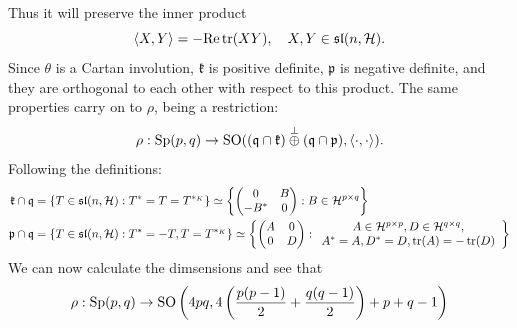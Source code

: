 \documentclass{report}
\begin{document}
\begin{itemize}
    Thus it will preserve the inner product
    \[
    \langle X, Y \rangle = -\mathrm{Re}\operatorname{tr}(X Y), \quad X, Y \in \mathfrak{sl}(n, \mathcal H).
    \]
    Since $\theta$ is a Cartan involution, $\mathfrak k$ is positive definite, $\mathfrak p$ is negative definite, and they are orthogonal to each other with respect to this product.
    The same properties carry on to $\rho$, being a restriction:
    \[
    \rho: \operatorname{{\mathrm{Sp}}}(p,q) \to \operatorname{{\mathrm{SO}}}((\mathfrak q \cap \mathfrak k) \overset{\perp}{\oplus} (\mathfrak q \cap \mathfrak p), \langle \cdot, \cdot \rangle). 
    \]
    Following the definitions:
    \begin{align*}
        \mathfrak k \cap \mathfrak q &= \left\{ T \in \mathfrak{sl}(n, \mathcal H) : T^* = T = T^{*_K} \right\} \simeq 
        \left\{ 
            \begin{pmatrix}
                0 & B \\
                -B^* & 0
            \end{pmatrix} : B \in \mathcal H^{p \times q}
         \right\}\\
         \mathfrak p \cap \mathfrak q &= \left\{ T \in \mathfrak{sl}(n, \mathcal H) : T^* = -T, T = T^{*_K} \right\} \simeq 
        \left\{ 
            \begin{pmatrix}
                A & 0 \\
                0 & D
            \end{pmatrix} : 
            \begin{array}{c}
                A \in \mathcal H^{p \times p}, D \in \mathcal H^{q \times q},\\
                 A^* = A, D^* = D, \operatorname{tr}(A) = -\operatorname{tr}(D)    
            \end{array}
         \right\}\\
    \end{align*}
    We can now calculate the dimsensions and see that
    \[
    \rho: \operatorname{{\mathrm{Sp}}}(p,q) \to \operatorname{{\mathrm{SO}}}\left(4pq, 4\left(\frac{p(p-1)}{2} + \frac{q(q-1)}{2}\right) + p + q - 1\right)
    \]
\end{itemize}
\end{document}
